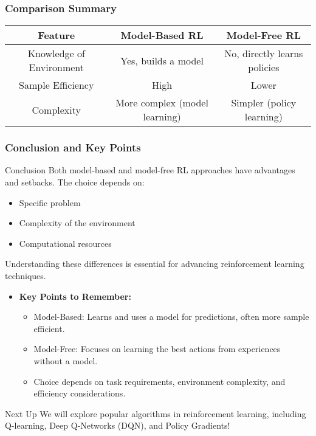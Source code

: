 \documentclass[aspectratio=169]{beamer}
\begin{document}
\begin{frame}[fragile]
    \frametitle{Comparison Summary}
    
    \begin{center}
        \begin{tabular}{|c|c|c|}
            \hline
            \textbf{Feature} & \textbf{Model-Based RL} & \textbf{Model-Free RL} \\
            \hline
            Knowledge of Environment & Yes, builds a model & No, directly learns policies \\
            \hline
            Sample Efficiency & High & Lower \\
            \hline
            Complexity & More complex (model learning) & Simpler (policy learning) \\
            \hline
        \end{tabular}
    \end{center}
\end{frame}

\begin{frame}[fragile]
    \frametitle{Conclusion and Key Points}
    
    \begin{block}{Conclusion}
        Both model-based and model-free RL approaches have advantages and setbacks. The choice depends on:
        \begin{itemize}
            \item Specific problem
            \item Complexity of the environment
            \item Computational resources
        \end{itemize}
        Understanding these differences is essential for advancing reinforcement learning techniques.
    \end{block}
    
    \begin{itemize}
        \item \textbf{Key Points to Remember:}
        \begin{itemize}
            \item Model-Based: Learns and uses a model for predictions, often more sample efficient.
            \item Model-Free: Focuses on learning the best actions from experiences without a model.
            \item Choice depends on task requirements, environment complexity, and efficiency considerations.
        \end{itemize}
    \end{itemize}
    
    \begin{block}{Next Up}
        We will explore popular algorithms in reinforcement learning, including Q-learning, Deep Q-Networks (DQN), and Policy Gradients!
    \end{block}
\end{frame}
\end{document}
